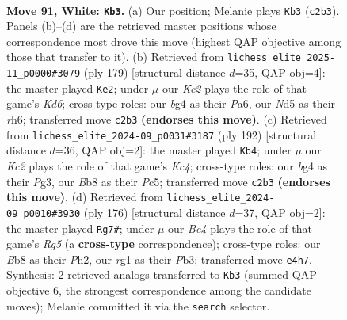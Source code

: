 \documentclass[11pt]{article}
\begin{document}
\begin{figure}[p]\centering
\begin{subfigure}{0.46\textwidth}\centering
\resizebox{\linewidth}{!}{%
\newchessgame
\chessboard[
  setfen={1B4k1/8/1P3R2/3N4/P3B1b1/7p/2K5/6r1 w - - 3 91},
  showmover=false,
  pgfstyle=straightmove, color=movearrow, markmove={c2-b3}
]}
\caption{}
\end{subfigure}\hfill
\begin{subfigure}{0.46\textwidth}\centering
\resizebox{\linewidth}{!}{%
\newchessgame
\chessboard[
  setfen={8/2K5/p6R/Pbp5/8/n2k4/8/4B3 b - - 58 90},
  showmover=false,
  pgfstyle=straightmove, color=movearrow, markmove={d3-e2}
]}
\caption{}
\end{subfigure}
\\[4pt]
\begin{subfigure}{0.46\textwidth}\centering
\resizebox{\linewidth}{!}{%
\newchessgame
\chessboard[
  setfen={3R4/5k2/2b1r3/2P4p/2K4B/6P1/8/8 w - - 9 97},
  showmover=false,
  pgfstyle=straightmove, color=movearrow, markmove={c4-b4}
]}
\caption{}
\end{subfigure}\hfill
\begin{subfigure}{0.46\textwidth}\centering
\resizebox{\linewidth}{!}{%
\newchessgame
\chessboard[
  setfen={b7/5N1k/5B2/6R1/5n2/KP5p/7P/8 w - - 2 89},
  showmover=false,
  pgfstyle=straightmove, color=movearrow, markmove={g5-g7}
]}
\caption{}
\end{subfigure}
\caption{\textbf{Move 91, White: \texttt{Kb3}.} (a) Our position; Melanie plays \texttt{Kb3} (\texttt{c2b3}). Panels (b)--(d) are the retrieved master positions whose correspondence most drove this move (highest QAP objective among those that transfer to it). (b) Retrieved from \texttt{lichess\_elite\_2025-11\_p0000\#3079} (ply 179) [structural distance $d$=35, QAP obj=4]: the master played \texttt{Ke2}; under $\mu$ our \emph{Kc2} plays the role of that game's \emph{Kd6}; cross-type roles: our \emph{b}g4 as their \emph{P}a6, our \emph{N}d5 as their \emph{r}h6; transferred move \texttt{c2b3} \textbf{(endorses this move)}. (c) Retrieved from \texttt{lichess\_elite\_2024-09\_p0031\#3187} (ply 192) [structural distance $d$=36, QAP obj=2]: the master played \texttt{Kb4}; under $\mu$ our \emph{Kc2} plays the role of that game's \emph{Kc4}; cross-type roles: our \emph{b}g4 as their \emph{P}g3, our \emph{B}b8 as their \emph{P}c5; transferred move \texttt{c2b3} \textbf{(endorses this move)}. (d) Retrieved from \texttt{lichess\_elite\_2024-09\_p0010\#3930} (ply 176) [structural distance $d$=37, QAP obj=2]: the master played \texttt{Rg7\#}; under $\mu$ our \emph{Be4} plays the role of that game's \emph{Rg5} (a \textbf{cross-type} correspondence); cross-type roles: our \emph{B}b8 as their \emph{P}h2, our \emph{r}g1 as their \emph{P}b3; transferred move \texttt{e4h7}. Synthesis: 2 retrieved analogs transferred to \texttt{Kb3} (summed QAP objective 6, the strongest correspondence among the candidate moves); Melanie committed it via the \texttt{search} selector.}
\label{fig:thought-m180}
\end{figure}
\end{document}
